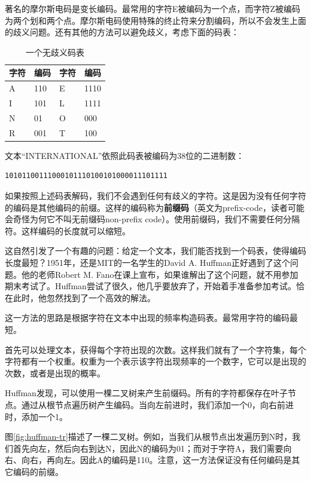 \documentclass[b5paper]{ctexart}
\begin{document}
著名的摩尔斯电码是变长编码。最常用的字符E被编码为一个点，而字符Z被编码为两个划和两个点。摩尔斯电码使用特殊的终止符来分割编码，所以不会发生上面的歧义问题。还有其他的方法可以避免歧义，考虑下面的码表：

\begin{table}[htbp]
\centering
\begin{tabular}{l|l||l|l}
字符 & 编码 & 字符 & 编码 \\
\hline
A & 110 & E & 1110 \\
I & 101 & L & 1111 \\
N & 01 & O & 000 \\
R & 001 & T & 100 \\
\hline
\end{tabular}
\caption{一个无歧义码表} \label{tab:example-prefix-code}
\end{table}

文本“INTERNATIONAL”依照此码表被编码为38位的二进制数：

\begin{Verbatim}[fontsize=\footnotesize]
10101100111000101110100101000011101111
\end{Verbatim}

如果按照上述码表解码，我们不会遇到任何有歧义的字符。这是因为没有任何字符的编码是其他编码的前缀。这样的编码称为\textbf{前缀码}（英文为prefix-code，读者可能会奇怪为何它不叫无前缀码non-prefix code）。使用前缀码，我们不需要任何分隔符。这样编码的长度就可以缩短。

这自然引发了一个有趣的问题：给定一个文本，我们能否找到一个码表，使得编码长度最短？1951年，还是MIT的一名学生的David A. Huffman正好遇到了这个问题\cite{Huffman}。他的老师Robert M. Fano在课上宣布，如果谁解出了这个问题，就不用参加期末考试了。Huffman尝试了很久，他几乎要放弃了，开始着手准备参加考试。恰在此时，他忽然找到了一个高效的解法。

这一方法的思路是根据字符在文本中出现的频率构造码表。最常用字符的编码最短。

首先可以处理文本，获得每个字符出现的次数。这样我们就有了一个字符集，每个字符都有一个权重。权重为一个表示该字符出现频率的一个数字，它可以是出现的次数，或者是出现的概率。

Huffman发现，可以使用一棵二叉树来产生前缀码。所有的字符都保存在叶子节点。通过从根节点遍历树产生编码。当向左前进时，我们添加一个0，向右前进时，添加一个1。

图\ref{fig:huffman-tr}描述了一棵二叉树。例如，当我们从根节点出发遍历到N时，我们首先向左，然后向右到达N，因此N的编码为01；而对于字符A，我们需要向右、向右，再向左。因此A的编码是110。注意，这一方法保证没有任何编码是其它编码的前缀。
\end{document}
